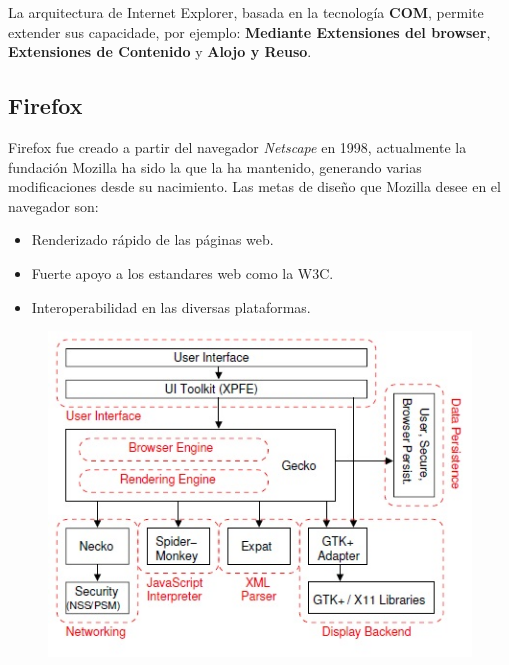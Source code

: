     La arquitectura de Internet Explorer, basada en la tecnología \textbf{COM}, permite extender sus capacidade, por ejemplo: \textbf{Mediante Extensiones del browser}, \textbf{Extensiones de Contenido} y \textbf{Alojo y Reuso}.


    \subsection{Firefox}
    \label{chap3:Firefox}

    Firefox fue creado a partir del navegador \textit{Netscape} en 1998, actualmente la fundación Mozilla ha sido la que la ha mantenido, generando varias modificaciones desde su nacimiento. Las metas de diseño que Mozilla desee en el navegador son:
    \begin{itemize}
        \item Renderizado rápido de las páginas web.
        \item Fuerte apoyo a los estandares web como la W3C.
        \item Interoperabilidad en las diversas plataformas.
    \end{itemize}

    \begin{figure}[h!t]
        \begin{center}
    		\includegraphics[scale=0.8]{figures/archMoz.jpg}
          \label{fig:archM}
        \end{center}
    \end{figure}
            
